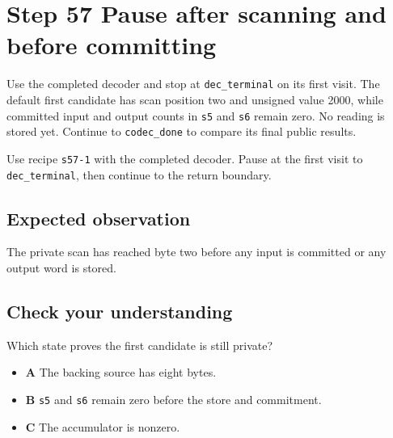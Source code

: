 \section{Step 57 Pause after scanning and before committing}\label{delta-s57}

Use the completed decoder and stop at \texttt{dec\_terminal} on its first visit. The default first candidate has scan position two and unsigned value 2000, while committed input and output counts in \texttt{s5} and \texttt{s6} remain zero. No reading is stored yet. Continue to \texttt{codec\_done} to compare its final public results.

Use recipe \texttt{s57-1} with the completed decoder. Pause at the first visit to \texttt{dec\_terminal}, then continue to the return boundary.

\subsection{Expected observation}
The private scan has reached byte two before any input is committed or any output word is stored.

\subsection{Check your understanding}
Which state proves the first candidate is still private?

\begin{itemize}
  \item \textbf{A} The backing source has eight bytes.
  \item \textbf{B} \texttt{s5} and \texttt{s6} remain zero before the store and commitment.
  \item \textbf{C} The accumulator is nonzero.
\end{itemize}
